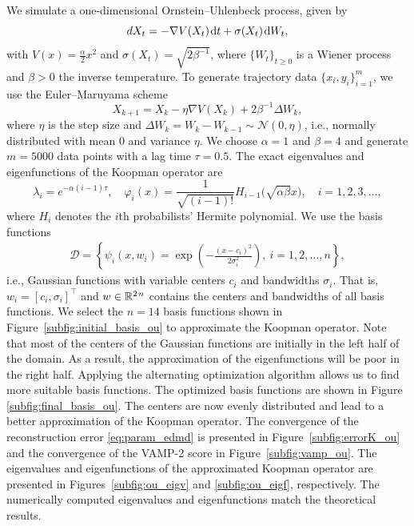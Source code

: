 \documentclass
[
    a4paper,
    DIV=11,
    abstract=true,
    11pt,
]
{scrartcl}
\newcommand{\R}{\mathbb{R}}                                      %
\newcommand{\ts}{\hspace*{0.1em}}                                %
\theoremstyle{definition}
\begin{document}
We simulate a one-dimensional Ornstein--Uhlenbeck process, given by
\begin{equation} \label{eq:SDE}
    dX_t = -\nabla V(X_t) \ts \mathrm{d}t + \sigma(X_t) \ts \mathrm{d}W_t,
\end{equation}
with $V(x) = \frac{\alpha}{2}x^2$ and $\sigma(X_t) = \sqrt{2 \beta^{-1}}$, where $\{W_t\}_{t \geq 0}$ is a Wiener process and $\beta>0$ the inverse temperature. To generate trajectory data $\{x_i, y_i\}_{i=1}^m$, we use the Euler--Maruyama scheme
\begin{equation*}
    X_{k+1} = X_k - \eta \nabla V(X_k) + 2 \beta^{-1} \Delta W_k,
\end{equation*}
where $\eta$ is the step size and $\Delta W_k = W_k - W_{k-1} \sim \mathcal{N}(0, \eta)$, i.e., normally distributed with mean $0$ and variance $\eta$. We choose $\alpha = 1$ and $ \beta = 4$ and generate $m = 5000$ data points with a lag time $\tau = 0.5$. The exact eigenvalues and eigenfunctions of the Koopman operator are
\begin{equation*}
    \lambda_i = e^{-\alpha(i-1)\tau}, \quad \varphi_i(x) = \frac{1}{\sqrt{(i-1)!}}H_{i-1}\big(\sqrt{\alpha \beta} x \big), \quad i = 1,2,3,\dots,
\end{equation*}
where $H_i$ denotes the $i$th probabilists' Hermite polynomial. We use the basis functions
\begin{align*}
    \mathcal{D} = \left\{ \psi_i(x, w_i) =  \exp\left(-\tfrac{(x - c_{i})^2}{2\sigma_{i}^2}\right), ~ i = 1, 2, \dots, n \right\},
\end{align*}
i.e., Gaussian functions with variable centers $ c_i $ and bandwidths $ \sigma_i $. That is, $ w_i = [c_i, \sigma_i]^\top $ and $ w \in \R^{2 \ts n} $ contains the centers and bandwidths of all basis functions. We select the $n=14$ basis functions shown in Figure~\ref{subfig:initial_basis_ou} to approximate the Koopman operator. Note that most of the centers of the Gaussian functions are initially in the left half of the domain. As a result, the approximation of the eigenfunctions will be poor in the right half. Applying the alternating optimization algorithm allows us to find more suitable basis functions. The optimized basis functions are shown in Figure \ref{subfig:final_basis_ou}. The centers are now evenly distributed and lead to a better approximation of the Koopman operator. The convergence of the reconstruction error \eqref{eq:param_edmd} is presented in Figure~\ref{subfig:errorK_ou} and the convergence of the VAMP-2 score in Figure~\ref{subfig:vamp_ou}. The eigenvalues and eigenfunctions of the approximated Koopman operator are presented in Figures~\ref{subfig:ou_eigv} and \ref{subfig:ou_eigf}, respectively. The numerically computed eigenvalues and eigenfunctions match the theoretical results.
\end{document}
